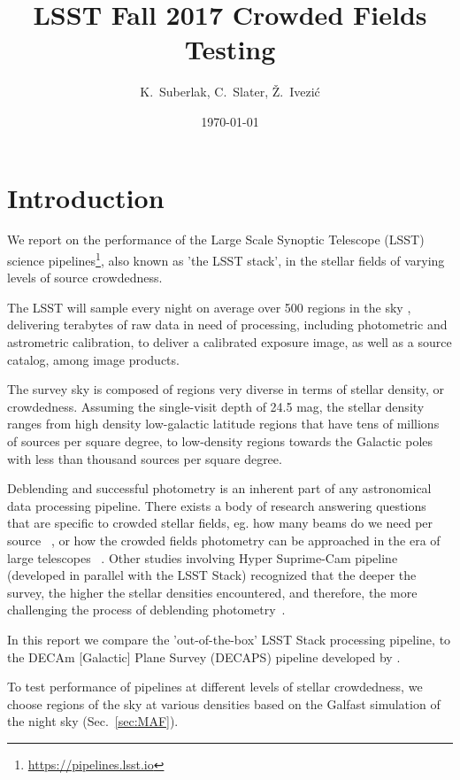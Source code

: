 \documentclass[DM,lsstdraft,toc,usenatbib,authoryear]{lsstdoc}
\title[Crowded fields]{LSST Fall 2017 Crowded Fields Testing}
\author{
K.~Suberlak, C.~Slater, \v{Z}.~Ivezi\'c}
\date{\today}
\begin{document}
\maketitle

\section{Introduction}

We report on the performance of the Large Scale Synoptic Telescope (LSST) science pipelines\footnote{\url{https://pipelines.lsst.io}}, also known as 'the LSST stack', in the stellar fields of varying levels of source crowdedness.

The LSST will sample every night on average over 500  regions in the sky , delivering terabytes of raw data in need of processing, including photometric  and astrometric calibration, to deliver a calibrated exposure image, as well as a source catalog, among image products.

The survey sky is composed of regions very diverse in terms of stellar density, or crowdedness. Assuming the single-visit depth of 24.5 mag, the stellar density ranges from high density low-galactic latitude regions that have tens of millions of sources per square degree, to low-density regions towards the Galactic poles with less than thousand sources per square degree.

Deblending and successful photometry is an inherent part of any astronomical data processing pipeline.  There exists a body of research answering questions that are specific to crowded stellar fields, eg. how many beams do we need per source ~\citep{hogg2001}, or how  the crowded fields photometry can be approached in the era of large telescopes ~\citep{olsen2003}. Other studies involving Hyper Suprime-Cam pipeline (developed in parallel with the LSST Stack) recognized that the deeper the survey, the higher the stellar densities encountered, and therefore, the more challenging the process of deblending photometry~\citep{bosch2017}.

In this report we compare the 'out-of-the-box' LSST Stack processing pipeline, to the DECAm [Galactic] Plane Survey (DECAPS) pipeline developed by \citet{schlafly2017}.

To test performance of pipelines at different levels of stellar crowdedness, we choose regions of the sky at various densities based on the Galfast simulation of the night sky (Sec.~\ref{sec:MAF}).
\end{document}
